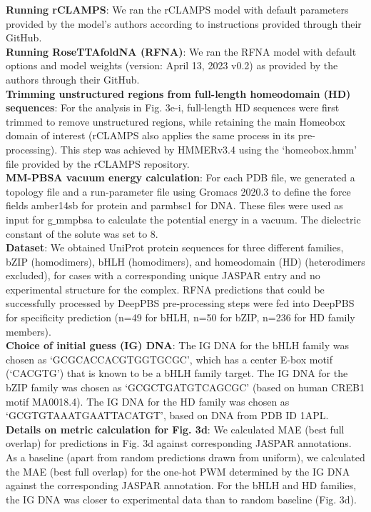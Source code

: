 \textbf{Running rCLAMPS}: We ran the rCLAMPS model with default parameters provided by the model’s authors according to instructions provided through their GitHub.
\\
\textbf{Running RoseTTAfoldNA (RFNA)}: We ran the RFNA model with default options and model weights (version: April 13, 2023 v0.2) as provided by the authors through their GitHub.
\\
\textbf{Trimming unstructured regions from full-length homeodomain (HD) sequences}: For the analysis in Fig. 3e-i, full-length HD sequences were first trimmed to remove unstructured regions, while retaining the main Homeobox domain of interest (rCLAMPS also applies the same process in its pre-processing). This step was achieved by HMMERv3.4 \citep{Finn2011} using the ‘homeobox.hmm’ file provided by the rCLAMPS repository. 
\\
\textbf{MM-PBSA vacuum energy calculation}: For each PDB file, we generated a topology file and a run-parameter file using Gromacs 2020.3 to define the force fields amber14sb for protein and parmbsc1 for DNA. These files were used as input for g$\_$mmpbsa to calculate the potential energy in a vacuum. The dielectric constant of the solute was set to 8. 
\\
\textbf{Dataset}: We obtained UniProt protein sequences for three different families, bZIP (homodimers), bHLH (homodimers), and homeodomain (HD) (heterodimers excluded), for cases with a corresponding unique JASPAR entry and no experimental structure for the complex. RFNA predictions that could be successfully processed by DeepPBS pre-processing steps were fed into DeepPBS for specificity prediction (n=49 for bHLH, n=50 for bZIP, n=236 for HD family members).
\\
\textbf{Choice of initial guess (IG) DNA}: The IG DNA for the bHLH family was chosen as ‘GCGCACCACGTGGTGCGC’, which has a center E-box motif (‘CACGTG’) that is known \citep{demartin2021} to be a bHLH family target. The IG DNA for the bZIP family was chosen as ‘GCGCTGATGTCAGCGC’ (based on human CREB1 motif MA0018.4). The IG DNA for the HD family was chosen as ‘GCGTGTAAATGAATTACATGT’, based on DNA from PDB ID 1APL. 
\\
\textbf{Details on metric calculation for Fig. 3d}: We calculated MAE (best full overlap) for predictions in Fig. 3d against corresponding JASPAR annotations. As a baseline (apart from random predictions drawn from uniform), we calculated the MAE (best full overlap) for the one-hot PWM determined by the IG DNA against the corresponding JASPAR annotation. For the bHLH and HD families, the IG DNA was closer to experimental data than to random baseline (Fig. 3d).
